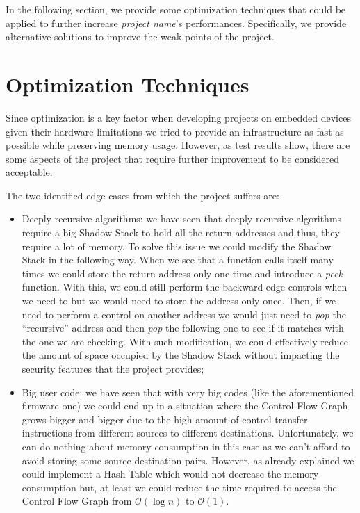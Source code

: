 In the following section, we provide some optimization techniques that could be applied
to further increase \textit{project name}'s performances. Specifically, we
provide alternative solutions to improve the weak points of the project.

\section{Optimization Techniques}
\label{sec:pa_optimization}

Since optimization is a key factor when developing projects on embedded devices given
their hardware limitations we tried to provide an infrastructure as fast as possible
while preserving memory usage. However, as test results show, there are some
aspects of the project that require further improvement to be considered
acceptable.

The two identified edge cases from which the project suffers are:
\begin{itemize}
  \item Deeply recursive algorithms: we have seen that deeply recursive
    algorithms require a big Shadow Stack to hold all the return addresses and
    thus, they require a lot of memory. To solve this issue we could modify the
    Shadow Stack in the following way. When we see that a function calls itself many
    times we could store the return address only one time and introduce a \textit{peek}
    function. With this, we could still perform the backward edge controls when
    we need to but we would need to store the address only once. Then, if we
    need to perform a control on another address we would just need to \textit{pop}
    the ``recursive'' address and then \textit{pop} the following one to see if
    it matches with the one we are checking. With such modification, we could
    effectively reduce the amount of space occupied by the Shadow Stack without
    impacting the security features that the project provides;

  \item Big user code: we have seen that with very big codes (like the aforementioned
    firmware one) we could end up in a situation where the Control Flow Graph
    grows bigger and bigger due to the high amount of control transfer
    instructions from different sources to different destinations. Unfortunately,
    we can do nothing about memory consumption in this case as we can't afford
    to avoid storing some source-destination pairs. However, as already
    explained we could implement a Hash Table which would not decrease the
    memory consumption but, at least we could reduce the time required to access
    the Control Flow Graph from $\mathcal{O}(\log{n})$ to $\mathcal{O}(1)$.
\end{itemize}

